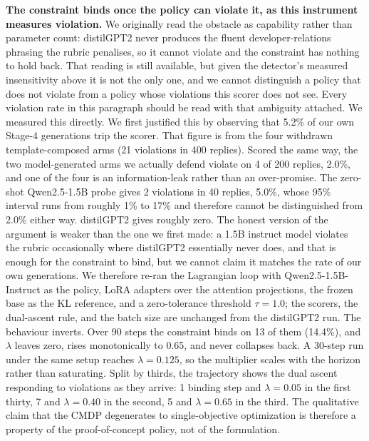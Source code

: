 \documentclass[sigconf, anonymous]{acmart}
\begin{document}
  \textbf{The constraint binds once the policy can violate it, as this instrument measures
  violation.} We originally read the obstacle as capability rather than parameter count:
  distilGPT2 never produces the fluent developer-relations phrasing the rubric penalises, so it
  cannot violate and the constraint has nothing to hold back. That reading is still available,
  but given the detector's measured insensitivity above it is not the only one, and we cannot
  distinguish a policy that does not violate from a policy whose violations this scorer does not
  see. Every violation rate in this paragraph should be read with that ambiguity attached. We
  measured this directly. We first justified this by observing that 5.2\% of our own Stage-4
  generations trip the scorer. That figure is from the four withdrawn template-composed arms
  (21 violations in 400 replies). Scored the same way, the two model-generated arms we actually
  defend violate on 4 of 200 replies, 2.0\%, and one of the four is an information-leak rather
  than an over-promise. The zero-shot Qwen2.5-1.5B probe gives 2 violations in 40 replies, 5.0\%,
  whose 95\% interval runs from roughly 1\% to 17\% and therefore cannot be distinguished from
  2.0\% either way. distilGPT2 gives roughly zero. The honest version of the argument is weaker
  than the one we first made: a 1.5B instruct model violates the rubric occasionally where
  distilGPT2 essentially never does, and that is enough for the constraint to bind, but we cannot
  claim it matches the rate of our own generations. We therefore re-ran the Lagrangian loop with Qwen2.5-1.5B-Instruct as the
  policy, LoRA adapters over the attention projections, the frozen base as the KL reference, and
  a zero-tolerance threshold $\tau = 1.0$; the scorers, the dual-ascent rule, and the batch size
  are unchanged from the distilGPT2 run. The behaviour inverts. Over 90 steps the constraint binds
  on 13 of them (14.4\%), and $\lambda$ leaves zero, rises monotonically to 0.65, and never
  collapses back. A 30-step run under the same setup reaches $\lambda = 0.125$, so the multiplier
  scales with the horizon rather than saturating. Split by thirds, the trajectory shows the dual
  ascent responding to violations as they arrive: 1 binding step and $\lambda = 0.05$ in the
  first thirty, 7 and $\lambda = 0.40$ in the second, 5 and $\lambda = 0.65$ in the third. The
  qualitative claim that the CMDP degenerates to single-objective optimization is therefore a
  property of the proof-of-concept policy, not of the formulation.
\end{document}
